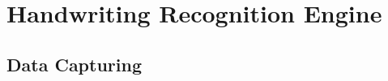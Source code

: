 
\chapter{Handwriting Recognition Engine}
\label{chap:handwritingrecognitionengine}





\section{Data Capturing}
\label{sec:hwre:datacapturing}

